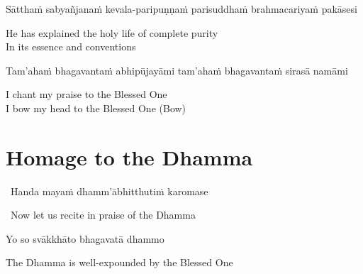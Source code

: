 \begin{pali-hang}
  Sātthaṁ sabyañjanaṁ kevala-paripuṇṇaṁ parisuddhaṁ brahmacariyaṁ pakāsesi
\end{pali-hang}

\begin{english}
  He has explained the holy life of complete purity\makeatletter\hyperlink{endnote4-appendix}\makeatother\\
  In its essence and conventions
\end{english}

\suttaRef{[SN 55.7]}

\begin{pali-hang}
  Tam'ahaṁ bhagavantaṁ abhipūjayāmi tam'ahaṁ bhagavantaṁ sirasā namāmi
\end{pali-hang}

\begin{english}
  I chant my praise to the Blessed One\\
  I bow my head to the Blessed One \hfill{(Bow)}
\end{english}

\suttaRef{[Thai]}

\section{Homage to the Dhamma}
\label{homage-dhamma}

\begin{leader}
  \anglebracketleft\ \hspace{-0.5mm}Handa mayaṁ dhamm'ābhitthutiṁ karomase \hspace{-0.5mm}\anglebracketright\
\end{leader}
\begin{leader-english-belowpali}
  \anglebracketleft\ \hspace{-0.5mm}Now let us recite in praise of the Dhamma \hspace{-0.5mm}\anglebracketright\
\end{leader-english-belowpali}

Yo so svākkhāto bhagavatā dhammo

\begin{english}
  The Dhamma is well-expounded by the Blessed One
\end{english}

